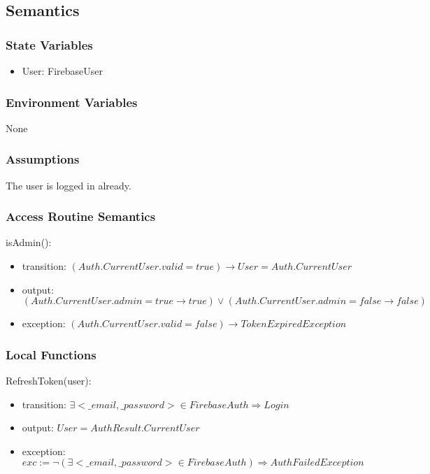 \documentclass[12pt, titlepage]{article}
\begin{document}
\subsection{Semantics}

\subsubsection{State Variables}

\begin{itemize}
\item User: FirebaseUser
\end{itemize}

\subsubsection{Environment Variables}

None

\subsubsection{Assumptions}

The user is logged in already.

\subsubsection{Access Routine Semantics}

\noindent isAdmin():
\begin{itemize}
\item transition: $(Auth.CurrentUser.valid = true) \rightarrow User = Auth.CurrentUser$ 
\item output: $(Auth.CurrentUser.admin = true \rightarrow true) \lor (Auth.CurrentUser.admin = false \rightarrow false)$
\item exception: $(Auth.CurrentUser.valid = false) \rightarrow TokenExpiredException$
\end{itemize}

\subsubsection{Local Functions}

\noindent RefreshToken(user):
\begin{itemize}
\item transition: $\exists <\_email, \_password> \in FirebaseAuth \Rightarrow Login$
\item output: $User = AuthResult.CurrentUser$
\item exception: $exc:= \lnot(\exists <\_email, \_password> \in FirebaseAuth) \Rightarrow AuthFailedException$
\end{itemize}
\end{document}
